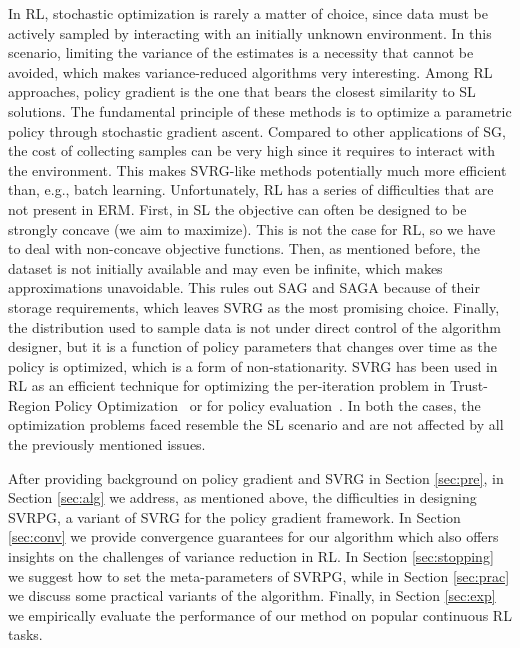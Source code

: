 \documentclass{article}
\makeatletter
\theoremstyle{remark}
\theoremstyle{definition}
\DeclareRobustCommand{\eg}{e.g.,\@\xspace}
\DeclareRobustCommand{\wrt}{w.r.t.\@\xspace}
\makeatother
\begin{document}
In RL, stochastic optimization is rarely a matter of choice, since data must be actively sampled by interacting with an initially unknown environment. In this scenario, limiting the variance of the estimates is a necessity that cannot be avoided, which makes variance-reduced algorithms very interesting.
Among RL approaches, policy gradient \cite{sutton2000policy} is the one that bears the closest similarity to SL solutions. The fundamental principle of these methods is to optimize a parametric policy through stochastic gradient ascent. Compared to other applications of SG, the cost of collecting samples can be very high since it requires to interact with the environment. This makes SVRG-like methods potentially much more efficient than, \eg batch learning.
Unfortunately, RL has a series of difficulties that are not present in ERM. First, in SL the objective can often be designed to be strongly concave (we aim to maximize). This is not the case for RL, so we have to deal with non-concave objective functions. Then, as mentioned before, the dataset is not initially available and may even be infinite, which makes approximations unavoidable. This rules out SAG and SAGA because of their storage requirements, which leaves SVRG as the most promising choice. Finally, the distribution used to sample data is not under direct control of the algorithm designer, but it is a function of policy parameters that changes over time as the policy is optimized, which is a form of non-stationarity.
SVRG has been used in RL as an efficient technique for optimizing the per-iteration problem in Trust-Region Policy Optimization~\citep{xu2017svrgtrpo} or for policy evaluation~\citep{du2017svrgpe}.
In both the cases, the optimization problems faced resemble the SL scenario and are not affected by all the previously mentioned issues.

After providing background on policy gradient and SVRG in Section \ref{sec:pre}, in Section \ref{sec:alg} we address, as mentioned above, the difficulties in designing SVRPG, a variant of SVRG for the policy gradient framework. In Section \ref{sec:conv} we provide convergence guarantees for our algorithm which also offers insights on the challenges of variance reduction in RL. In Section \ref{sec:stopping} we suggest how to set the meta-parameters of SVRPG, while in Section \ref{sec:prac} we discuss some practical variants of the algorithm. Finally, in Section \ref{sec:exp} we empirically evaluate the performance of our method on popular continuous RL tasks.
\end{document}

